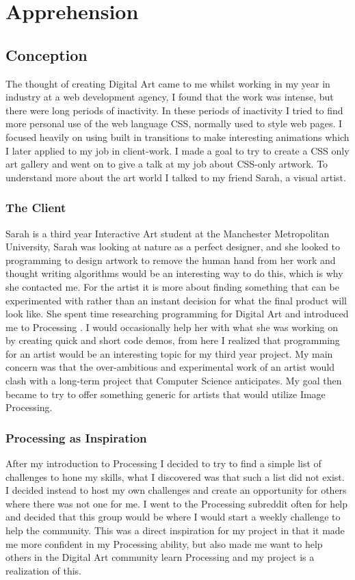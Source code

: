 \documentclass[a4paper]{report}
\begin{document}
\section{Apprehension}
\subsection{Conception}
The thought of creating Digital Art came to me whilst working in my year in industry at a web development agency, I found that the work was intense, but there were long periods of inactivity. In these periods of inactivity I tried to find more personal use of the web language CSS, normally used to style web pages. I focused heavily on using built in transitions to make interesting animations which I later applied to my job in client-work. I made a goal to try to create a CSS only art gallery and went on to give a talk at my job about CSS-only artwork. To understand more about the art world I talked to my friend Sarah, a visual artist.

\subsubsection{The Client}
Sarah is a third year Interactive Art student at the Manchester Metropolitan University, Sarah was looking at nature as a perfect designer, and she looked to programming to design artwork to remove the human hand from her work and thought writing algorithms would be an interesting way to do this, which is why she contacted me. For the artist it is more about finding something that can be experimented with rather than an instant decision for what the final product will look like. She spent time researching programming for Digital Art and introduced me to Processing \cite{PROCESSING}. I would occasionally help her with what she was working on by creating quick and short code demos, from here I realized that programming for an artist would be an interesting topic for my third year project. My main concern was that the over-ambitious and experimental work of an artist would clash with a long-term project that Computer Science anticipates. My goal then became to try to offer something generic for artists that would utilize Image Processing. 

\subsubsection{Processing as Inspiration}
After my introduction to Processing I decided to try to find a simple list of challenges to hone my skills, what I discovered was that such a list did not exist. I decided instead to host my own challenges and create an opportunity for others where there was not one for me. I went to the Processing subreddit\cite{RPROCESSING} often for help and decided that this group would be where I would start a weekly challenge to help the community. This was a direct inspiration for my project in that it made me more confident in my Processing ability, but also made me want to help others in the Digital Art community learn Processing and my project is a realization of this.
\end{document}
